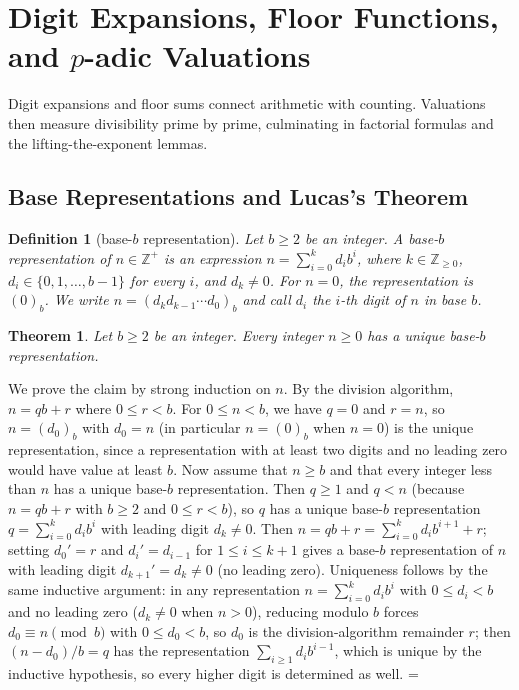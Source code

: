 \documentclass[11pt]{article}
\makeatletter
\let\nt@closedisplay\]
\def\nt@guardedclose{\@ifnextchar\par{\nt@closeafterpar}{\@ifnextchar\end{\postdisplaypenalty\@M\nt@closedisplay}{\nt@closedisplay}}}
\def\nt@closeafterpar\par{\@ifnextchar\par{\nt@closeafterpar}{\@ifnextchar\end{\postdisplaypenalty\@M\nt@closedisplay\par}{\nt@closedisplay\par}}}
\renewenvironment{proof}[1][\proofname]{\par
  \pushQED{\qed}\normalfont\topsep\medskipamount\edef\nt@afterproof{\@endparpenalty=\the\@endparpenalty\relax}\@beginparpenalty\@M\@endparpenalty\@M\let\]\nt@guardedclose\trivlist\item[]\textit{#1\@addpunct{.}} \ignorespaces}{\ifvmode\addpenalty\@M\fi\popQED\nt@afterproof\endtrivlist\@endpefalse}
\theoremstyle{ntstyle}
\newtheorem{theorem}{Theorem}[subsection]
\newtheorem{definition}{Definition}[subsection]
\makeatother
\begin{document}
\section{Digit Expansions, Floor Functions, and \texorpdfstring{$p$}{p}-adic Valuations}

Digit expansions and floor sums connect arithmetic with counting. Valuations then measure divisibility prime by
prime, culminating in factorial formulas and the lifting-the-exponent lemmas.


\subsection{Base Representations and Lucas's Theorem}

\begin{definition}[base-$b$ representation]\label{def:4.1.1}\label{def:base-b-representation}
  Let $b\ge2$ be an integer.
  A base-$b$ representation of $n\in\mathbb{Z}^+$ is an expression
  $n=\sum_{i=0}^{k}d_i b^i$, where $k\in\mathbb{Z}_{\ge0}$,
  $d_i\in\{0,1,\ldots,b-1\}$ for every $i$, and $d_k\neq0$.
  For $n=0$, the representation is $(0)_b$. We write
  $n=(d_kd_{k-1}\cdots d_0)_b$ and call $d_i$ the $i$-th digit of $n$ in base $b$.

\end{definition}

\begin{theorem}\label{thm:4.1.1} Let $b\ge2$ be an integer. Every integer $n \ge 0$ has a
  unique base-$b$ representation.

\end{theorem}

\begin{proof} We prove the claim by strong induction on $n$. By the
  division algorithm, $n = qb + r$ where $0 \le r < b$. For
  $0 \le n < b$, we have $q = 0$ and $r = n$, so $n = (d_0)_b$ with $d_0 = n$
  (in particular $n = (0)_b$ when $n = 0$) is the unique
  representation, since a representation with at least two digits and no leading
  zero would have value at least $b$. Now assume that $n \ge b$ and that every integer
  less than $n$ has a unique base-$b$ representation. Then $q\ge1$ and $q<n$ (because $n=qb+r$ with $b\ge2$ and
  $0\le r<b$), so $q$ has a unique base-$b$
  representation $q = \sum_{i=0}^{k} d_i b^{i}$ with leading digit $d_k \neq 0$. Then
  $n = qb + r = \sum_{i=0}^{k} d_i b^{i+1} + r$; setting
  $d_0' = r$ and $d_i' = d_{i-1}$ for $1\le i\le k+1$ gives a base-$b$
  representation of $n$ with leading digit $d_{k+1}' = d_k \neq 0$ (no leading
  zero). Uniqueness follows by the same inductive argument: in any representation
  $n = \sum_{i=0}^{k}d_i b^i$ with $0 \le d_i < b$ and no leading zero ($d_k\neq0$ when $n>0$), reducing modulo $b$
  forces $d_0 \equiv n \pmod{b}$ with $0 \le d_0 < b$, so $d_0$ is the
  division-algorithm remainder $r$; then $(n - d_0)/b = q$ has
  the representation $\sum_{i \ge 1} d_i b^{i-1}$, which is unique by the inductive
  hypothesis, so every higher digit is determined as well.
\end{proof}
\end{document}
